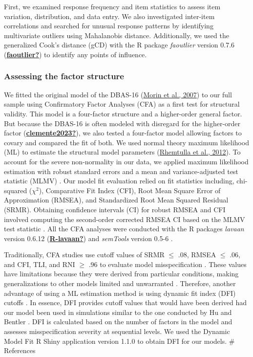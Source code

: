 \documentclass[
  ,doc,11pt, twoside,floatsintext]{apa6}
\begin{document}
First, we examined response frequency and item statistics to assess item variation, distribution, and data entry. We also investigated inter-item correlations and searched for unusual response patterns by identifying multivariate outliers using Mahalanobis distance. Additionally, we used the generalized Cook's distance (gCD) with the R package \emph{faoutlier} version 0.7.6 (\protect\hyperlink{ref-faoutlier}{\textbf{faoutlier?}}) to identify any points of influence.

\hypertarget{assessing-the-factor-structure}{%
\subsubsection{Assessing the factor structure}\label{assessing-the-factor-structure}}

We fitted the original model of the DBAS-16 (\protect\hyperlink{ref-morin2007a}{Morin et al., 2007}) to our full sample using Confirmatory Factor Analyses (CFA) as a first test for structural validity. This model is a four-factor structure and a higher-order general factor. But because the DBAS-16 is often modeled with disregard for the higher-order factor (\protect\hyperlink{ref-clemente2023}{\textbf{clemente2023?}}), we also tested a four-factor model allowing factors to covary and compared the fit of both. We used normal theory maximum likelihood (ML) to estimate the structural model parameters (\protect\hyperlink{ref-rhemtulla2012}{Rhemtulla et al., 2012}). To account for the severe non-normality in our data, we applied maximum likelihood estimation with robust standard errors and a mean and variance-adjusted test statistic (MLMV) \autocite{maydeu-olivares2017}. Our model fit evaluation relied on fit statistics including, chi-squared (\(\chi^2\)), Comparative Fit Index (CFI), Root Mean Square Error of Approximation (RMSEA), and Standardized Root Mean Squared Residual (SRMR). Obtaining confidence intervals (CI) for robust RMSEA and CFI involved computing the second-order corrected RMSEA CI based on the MLMV test statistic \autocite{savalei2018}. All the CFA analyses were conducted with the R packages \emph{lavaan} version 0.6.12 (\protect\hyperlink{ref-R-lavaan}{\textbf{R-lavaan?}}) and \emph{semTools} version 0.5-6 \autocite{R-semTools}.

Traditionally, CFA studies use cutoff values of SRMR \(\le\) .08, RMSEA \(\le\) .06, and CFI, TLI, and RNI \(\ge\) .96 to evaluate model misspecification \autocite{hu1999}. These values have limitations because they were derived from particular conditions, making generalizations to other models limited and unwarranted \autocite{marsh2004}. Therefore, another advantage of using a ML estimation method is using dynamic fit index (DFI) cutoffs \autocite{mcneish2021}. In essence, DFI provides cutoff values that would have been derived had our model been used in simulations similar to the one conducted by Hu and Bentler \autocite*{hu1999}. DFI is calculated based on the number of factors in the model and assesses misspecification severity at sequential levels. We used the Dynamic Model Fit R Shiny application version 1.1.0 \autocite{wolf2020} to obtain DFI for our models.
\# References
\end{document}
